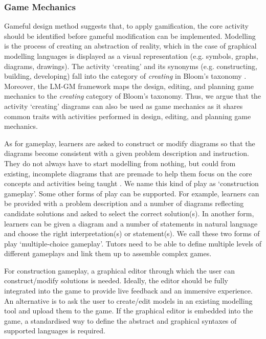 \documentclass[conference]{IEEEtran}
\begin{document}
\subsubsection{Game Mechanics} 
\label{Game Mechanics} 
Gameful design method \cite{deterding2015lens} suggests that, to apply gamification, the core activity should be identified before gameful modification can be implemented. Modelling is the process of creating an abstraction of reality, which in the case of graphical modelling languages is displayed as a visual representation (e.g. symbols, graphs, diagrams, drawings). The activity `creating' and its synonyms (e.g. constructing, building, developing) fall into the category of \emph{creating} in Bloom's taxonomy \cite{krathwohl2002revision}. Moreover, the LM-GM framework \cite{arnab2015mapping} maps the design, editing, and planning game mechanics to the \emph{creating} category of Bloom's taxonomy. Thus, we argue that the activity `creating' diagrams can also be used as game mechanics as it shares common traits with activities performed in design, editing, and planning game mechanics.

As for gameplay, learners are asked to construct or modify diagrams so that the diagrams become consistent with a given problem description and instruction. They do not always have to start modelling from nothing, but could from existing, incomplete diagrams that are premade to help them focus on the core concepts and activities being taught \cite{deterding2015lens}. We name this kind of play as `construction gameplay'. Some other forms of play can be supported. For example, learners can be provided with a problem description and a number of diagrams reflecting candidate solutions and asked to select the correct solution(s). In another form, learners can be given a diagram and a number of statements in natural language and choose the right interpretation(s) or statement(s). We call these two forms of play `multiple-choice gameplay'. Tutors need to be able to define multiple levels of different gameplays and link them up to assemble complex games. 

For construction gameplay, a graphical editor through which the user can construct/modify solutions is needed. Ideally, the editor should be fully integrated into the game to provide live feedback and an immersive experience. An alternative is to ask the user to create/edit models in an existing modelling tool and upload them to the game. If the graphical editor is embedded into the game, a standardised way to define the abstract and graphical syntaxes of supported languages is required. 
\end{document}
